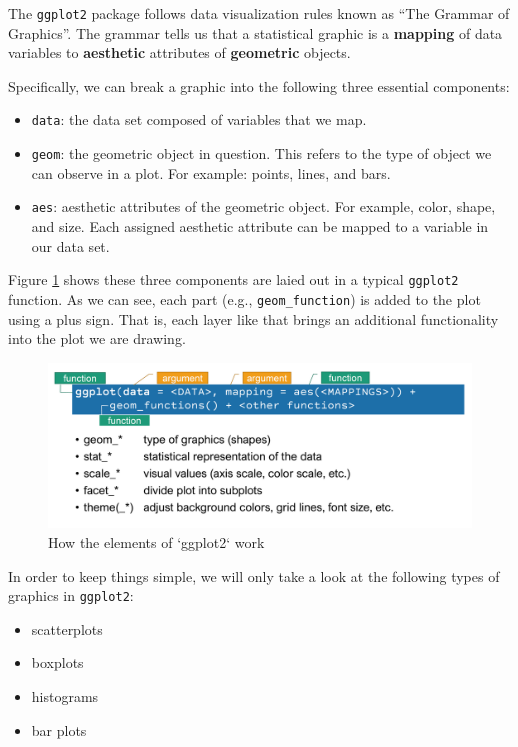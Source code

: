 \documentclass[]{book}
\providecommand{\tightlist}{%
  \setlength{\itemsep}{0pt}\setlength{\parskip}{0pt}}
\begin{document}
The \texttt{ggplot2} package \citep{R-ggplot2} follows data visualization rules known as ``The Grammar of Graphics''. The grammar tells us that a statistical graphic is a \textbf{mapping} of data variables to \textbf{aesthetic} attributes of \textbf{geometric} objects.

Specifically, we can break a graphic into the following three essential components:

\begin{itemize}
\tightlist
\item
  \texttt{data}: the data set composed of variables that we map.
\item
  \texttt{geom}: the geometric object in question. This refers to the type of object we can observe in a plot. For example: points, lines, and bars.
\item
  \texttt{aes}: aesthetic attributes of the geometric object. For example, color, shape, and size. Each assigned aesthetic attribute can be mapped to a variable in our data set.
\end{itemize}

Figure \ref{fig:ggplotmap} shows these three components are laied out in a typical \texttt{ggplot2} function. As we can see, each part (e.g., \texttt{geom\_function}) is added to the plot using a plus sign. That is, each layer like that brings an additional functionality into the plot we are drawing.

\begin{figure}

{\centering \includegraphics[width=0.65\linewidth]{figure/ggplot} 

}

\caption{How the elements of `ggplot2` work}\label{fig:ggplotmap}
\end{figure}

In order to keep things simple, we will only take a look at the following types of graphics in \texttt{ggplot2}:

\begin{itemize}
\tightlist
\item
  scatterplots
\item
  boxplots
\item
  histograms
\item
  bar plots
\end{itemize}
\end{document}
